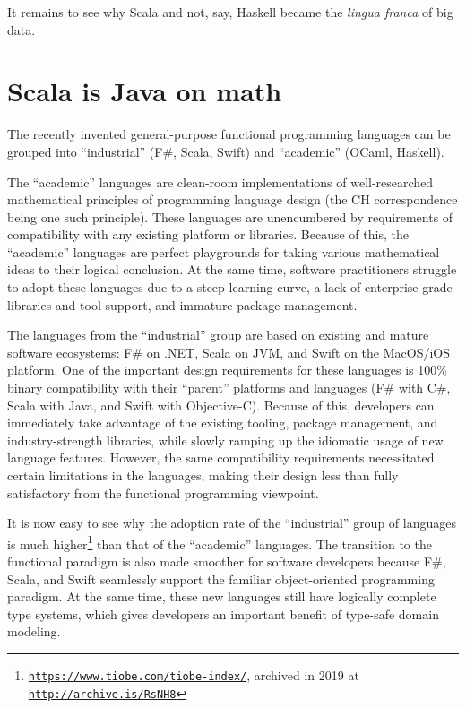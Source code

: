 It remains to see why Scala and not, say, Haskell became the \emph{lingua
franca} of big data.

\section{Scala is Java on math }

The recently invented general-purpose functional programming languages
can be grouped into ``industrial'' (F\#, Scala, Swift) and ``academic''
(OCaml, Haskell).

The ``academic'' languages are clean-room implementations of well-researched
mathematical principles of programming language design (the CH correspondence
being one such principle). These languages are unencumbered by requirements
of compatibility with any existing platform or libraries. Because
of this, the ``academic'' languages are perfect playgrounds for
taking various mathematical ideas to their logical conclusion. At
the same time, software practitioners struggle to adopt these languages
due to a steep learning curve, a lack of enterprise-grade libraries
and tool support, and immature package management.

The languages from the ``industrial'' group are based on existing
and mature software ecosystems: F\# on .NET, Scala on JVM, and Swift
on the MacOS/iOS platform. One of the important design requirements
for these languages is 100\% binary compatibility with their ``parent''
platforms and languages (F\# with C\#, Scala with Java, and Swift
with Objective-C). Because of this, developers can immediately take
advantage of the existing tooling, package management, and industry-strength
libraries, while slowly ramping up the idiomatic usage of new language
features. However, the same compatibility requirements necessitated
certain limitations in the languages, making their design less than
fully satisfactory from the functional programming viewpoint.

It is now easy to see why the adoption rate of the ``industrial''
group of languages is much higher\footnote{\texttt{\href{https://www.tiobe.com/tiobe-index/}{https://www.tiobe.com/tiobe-index/}},
archived in 2019 at \texttt{\href{http://archive.is/RsNH8}{http://archive.is/RsNH8}}} than that of the ``academic'' languages. The transition to the
functional paradigm is also made smoother for software developers
because F\#, Scala, and Swift seamlessly support the familiar object-oriented
programming paradigm. At the same time, these new languages still
have logically complete type systems, which gives developers an important
benefit of type-safe domain modeling.

